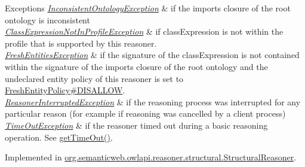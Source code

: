 \begin{DoxyExceptions}{Exceptions}
{\em \hyperlink{classorg_1_1semanticweb_1_1owlapi_1_1reasoner_1_1_inconsistent_ontology_exception}{Inconsistent\-Ontology\-Exception}} & if the imports closure of the root ontology is inconsistent \\
\hline
{\em \hyperlink{classorg_1_1semanticweb_1_1owlapi_1_1reasoner_1_1_class_expression_not_in_profile_exception}{Class\-Expression\-Not\-In\-Profile\-Exception}} & if {\ttfamily class\-Expression} is not within the profile that is supported by this reasoner. \\
\hline
{\em \hyperlink{classorg_1_1semanticweb_1_1owlapi_1_1reasoner_1_1_fresh_entities_exception}{Fresh\-Entities\-Exception}} & if the signature of the class\-Expression is not contained within the signature of the imports closure of the root ontology and the undeclared entity policy of this reasoner is set to \hyperlink{enumorg_1_1semanticweb_1_1owlapi_1_1reasoner_1_1_fresh_entity_policy_a762eae6d5b2449d125311ecaabfdc8d0}{Fresh\-Entity\-Policy\#\-D\-I\-S\-A\-L\-L\-O\-W}. \\
\hline
{\em \hyperlink{classorg_1_1semanticweb_1_1owlapi_1_1reasoner_1_1_reasoner_interrupted_exception}{Reasoner\-Interrupted\-Exception}} & if the reasoning process was interrupted for any particular reason (for example if reasoning was cancelled by a client process) \\
\hline
{\em \hyperlink{classorg_1_1semanticweb_1_1owlapi_1_1reasoner_1_1_time_out_exception}{Time\-Out\-Exception}} & if the reasoner timed out during a basic reasoning operation. See \hyperlink{interfaceorg_1_1semanticweb_1_1owlapi_1_1reasoner_1_1_o_w_l_reasoner_a44b2c968f989afe5290db29c90faa164}{get\-Time\-Out()}. \\
\hline
\end{DoxyExceptions}


Implemented in \hyperlink{classorg_1_1semanticweb_1_1owlapi_1_1reasoner_1_1structural_1_1_structural_reasoner_a86e6fd413dccfed789d9855aa0d7c23d}{org.\-semanticweb.\-owlapi.\-reasoner.\-structural.\-Structural\-Reasoner}.

